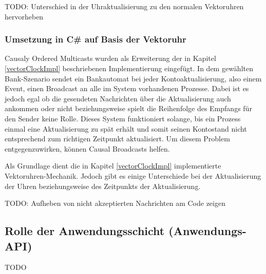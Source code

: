 TODO: Unterschied in der Uhraktualisierung zu den normalen Vektoruhren hervorheben

\subsubsection{Umsetzung in C\# auf Basis der Vektoruhr}
Causaly Ordered Multicasts wurden als Erweiterung der in Kapitel \ref{vectorClockImpl} beschriebenen Implementierung eingefügt. In dem gewählten Bank-Szenario sendet ein Bankautomat bei jeder Kontoaktualisierung, also einem Event, einen Broadcast an alle im System vorhandenen Prozesse. Dabei ist es jedoch egal ob die gesendeten Nachrichten über die Aktualisierung auch ankommen oder nicht beziehungsweise spielt die Reihenfolge des Empfangs für den Sender keine Rolle. Dieses System funktioniert solange, bis ein Prozess einmal eine Aktualisierung zu spät erhält und somit seinen Kontostand nicht entsprechend zum richtigen Zeitpunkt aktualisiert. Um diesem Problem entgegenzuwirken, können Causal Broadcasts helfen.

Als Grundlage dient die in Kapitel \ref{vectorClockImpl} implementierte Vektoruhren-Mechanik. Jedoch gibt es einige Unterschiede bei der Aktualisierung der Uhren beziehungsweise des Zeitpunkts der Aktualisierung.

TODO: Aufheben von nicht akzeptierten Nachrichten am Code zeigen
 
\subsection{Rolle der Anwendungsschicht (Anwendungs-API)}
TODO
\label{RolleDerAnwendung}